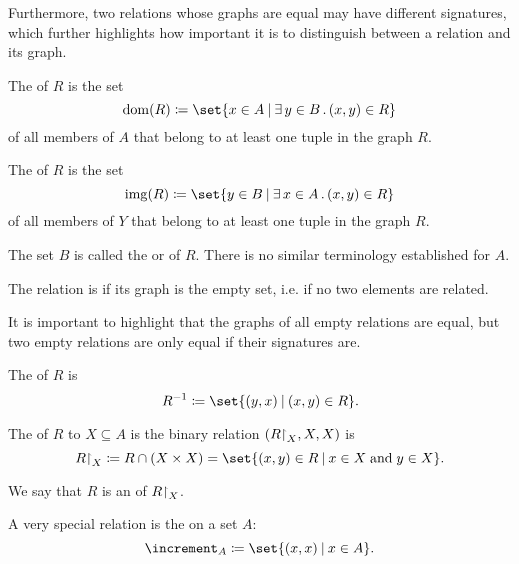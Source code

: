 \begin{definition}
\begin{thmenum}[series=def:binary_relation]
    Furthermore, two relations whose graphs are equal may have different signatures, which further highlights how important it is to distinguish between a relation and its graph.

     The  of \( R \) is the set
    \begin{equation*}
      \dom(R) \coloneqq \set{ x \in A \given \qexists {y \in B} (x, y) \in R }
    \end{equation*}
    of all members of \( A \) that belong to at least one tuple in the graph \( R \).

     The  of \( R \) is the set
    \begin{equation*}
      \img(R) \coloneqq \set{ y \in B \given \qexists {x \in A} (x, y) \in R }
    \end{equation*}
    of all members of \( Y \) that belong to at least one tuple in the graph \( R \).

     The set \( B \) is called the  or  of \( R \). There is no similar terminology established for \( A \).

     The relation is  if its graph is the empty set, i.e. if no two elements are related.

    It is important to highlight that the graphs of all empty relations are equal, but two empty relations are only equal if their signatures are.

     The  of \( R \) is
    \begin{equation*}
      R^{-1} \coloneqq \set{ (y, x) \given (x, y) \in R }.
    \end{equation*}

     The  of \( R \) to \( X \subseteq A \) is the binary relation \( (R{\upharpoonright}_{X}, X, X) \) is
    \begin{equation*}
      R\restr_{X} \coloneqq R \cap (X \times X) = \set{ (x, y) \in R \given x \in X \T{and} y \in X }.
    \end{equation*}

    We say that \( R \) is an  of \( R{\upharpoonright}_{X} \).

     A very special relation is the  on a set \( A \):
    \begin{equation*}
      \increment_A \coloneqq \set{ (x, x) \given x \in A }.
    \end{equation*}


\end{thmenum}
\end{definition}
